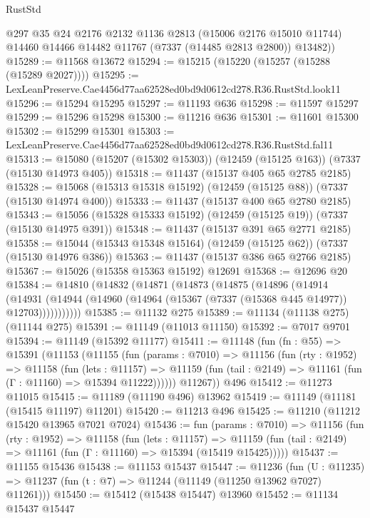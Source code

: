 \begin{lexlean}{RustStd}
\begin{coremodule}
        @297
        @35
        @24
        @2176
        @2132
        @1136
        @2813
        (@15006 @2176 @15010 @11744)
        @14460
        @14466
        @14482
        @11767
        (@7337 (@14485 @2813 @2800))
        @13482))
@15289 := @11568 @13672
@15294 := @15215 (@15220 (@15257 (@15288 (@15289 @2027))))
@15295 := LexLeanPreserve.Cae4456d77aa62528ed0bd9d0612cd278.R36.RustStd.look11
@15296 := @15294 @15295
@15297 := @11193 @636
@15298 := @11597 @15297
@15299 := @15296 @15298
@15300 := @11216 @636
@15301 := @11601 @15300
@15302 := @15299 @15301
@15303 := LexLeanPreserve.Cae4456d77aa62528ed0bd9d0612cd278.R36.RustStd.fal11
@15313 := @15080 (@15207 (@15302 @15303)) (@12459 (@15125 @163)) (@7337 (@15130 @14973 @405))
@15318 := @11437 (@15137 @405 @65 @2785 @2185)
@15328 := @15068 (@15313 @15318 @15192) (@12459 (@15125 @88)) (@7337 (@15130 @14974 @400))
@15333 := @11437 (@15137 @400 @65 @2780 @2185)
@15343 := @15056 (@15328 @15333 @15192) (@12459 (@15125 @19)) (@7337 (@15130 @14975 @391))
@15348 := @11437 (@15137 @391 @65 @2771 @2185)
@15358 := @15044 (@15343 @15348 @15164) (@12459 (@15125 @62)) (@7337 (@15130 @14976 @386))
@15363 := @11437 (@15137 @386 @65 @2766 @2185)
@15367 := @15026 (@15358 @15363 @15192) @12691
@15368 := @12696 @20
@15384 := @14810
    (@14832
      (@14871
        (@14873
          (@14875
            (@14896
              (@14914
                (@14931
                  (@14944 (@14960 (@14964 (@15367 (@7337 (@15368 @445 @14977)) @12703)))))))))))
@15385 := @11132 @275
@15389 := @11134 (@11138 @275) (@11144 @275)
@15391 := @11149 (@11013 @11150)
@15392 := @7017 @9701
@15394 := @11149 (@15392 @11177)
@15411 := @11148
    (fun (fn : @55) =>
    @15391
      (@11153
        (@11155
          (fun (params : @7010) =>
          @11156
            (fun (rty : @1952) =>
            @11158
              (fun (lets : @11157) =>
              @11159 (fun (tail : @2149) => @11161 (fun (Γ : @11160) => @15394 @11222))))))
        @11267))
    @496
@15412 := @11273 @11015
@15415 := @11189 (@11190 @496) @13962
@15419 := @11149 (@11181 (@15415 @11197) @11201)
@15420 := @11213 @496
@15425 := @11210 (@11212 @15420 @13965 @7021 @7024)
@15436 := fun (params : @7010) =>
  @11156
    (fun (rty : @1952) =>
    @11158
      (fun (lets : @11157) =>
      @11159 (fun (tail : @2149) => @11161 (fun (Γ : @11160) => @15394 (@15419 @15425)))))
@15437 := @11155 @15436
@15438 := @11153 @15437
@15447 := @11236
    (fun (U : @11235) => @11237 (fun (t : @7) => @11244 (@11149 (@11250 @13962 @7027) @11261)))
@15450 := @15412 (@15438 @15447) @13960
@15452 := @11134 @15437 @15447

\end{coremodule}
\end{lexlean}
